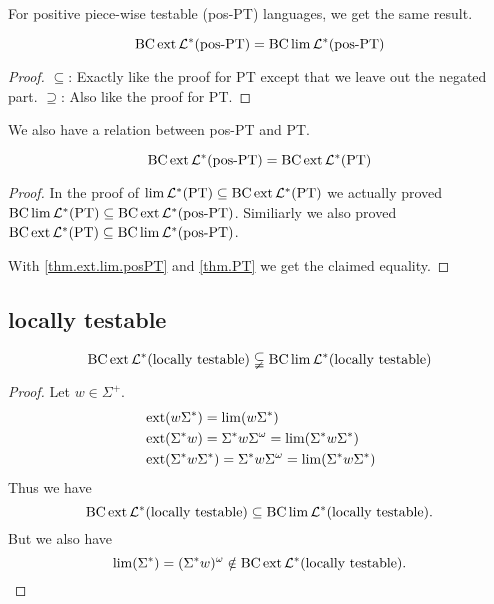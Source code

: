 \label{lang:posPT}
For positive piece-wise testable (pos-PT) languages, we get the same result.

\label{thm.ext.lim.posPT}
\begin{thm}
\[ \operatorname{BC} \operatorname{ext} \mathcal{L}^* (\textup{\textrm{pos-PT}}) = \operatorname{BC} \lim \mathcal{L}^* (\textup{\textrm{pos-PT}}) \]
\end{thm}

\begin{proof}
$\subseteq$: Exactly like the proof for PT except that we leave out the negated part.
$\supseteq$: Also like the proof for PT.
\end{proof}

We also have a relation between pos-PT and PT.

\begin{thm}
\[ \operatorname{BC} \operatorname{ext} \mathcal{L}^*(\textup{\textrm{pos-PT}}) = \operatorname{BC} \operatorname{ext} \mathcal{L}^* (\textup{\textrm{PT}}) \]

\begin{proof}
In the proof of $\lim \mathcal{L}^*(\textup{\textrm{PT}}) \subseteq \operatorname{BC} \operatorname{ext} \mathcal{L}^* (\textup{\textrm{PT}})$ we actually proved $\operatorname{BC} \lim \mathcal{L}^*(\textup{\textrm{PT}}) \subseteq \operatorname{BC} \operatorname{ext} \mathcal{L}^* (\textup{\textrm{pos-PT}})$. Similiarly we also proved $\operatorname{BC} \operatorname{ext} \mathcal{L}^* (\textup{\textrm{PT}}) \subseteq \operatorname{BC} \lim \mathcal{L}^* (\textup{\textrm{pos-PT}})$.

With \ref{thm.ext.lim.posPT} and \ref{thm.PT} we get the claimed equality.
\end{proof}
\end{thm}


\subsection{locally testable}
\label{lang:LT}

\begin{thm}
\[ \operatorname{BC} \operatorname{ext} \mathcal{L}^* (\textup{\textrm{locally testable}}) \subsetneqq \operatorname{BC} \lim \mathcal{L}^*(\textup{\textrm{locally testable}})  \]
\end{thm}

\begin{proof}
Let $w \in \Sigma^+$.
\begin{align*}
& \operatorname{ext} (w \Sigma^*) = \lim(w \Sigma^*) \\
& \operatorname{ext}( \Sigma^* w) = \Sigma^* w \Sigma^\omega = \lim( \Sigma^* w \Sigma^* ) \\
& \operatorname{ext}( \Sigma^* w \Sigma^*) = \Sigma^* w \Sigma^\omega = \lim( \Sigma^* w \Sigma^* )
\end{align*}
Thus we have
\[ \operatorname{BC} \operatorname{ext} \mathcal{L}^* (\textup{\textrm{locally testable}}) \subseteq \operatorname{BC} \lim \mathcal{L}^*(\textup{\textrm{locally testable}}) . \]
But we also have
\[ \lim(\Sigma^*) = (\Sigma^* w)^\omega \notin \operatorname{BC} \operatorname{ext} \mathcal{L}^* (\textup{\textrm{locally testable}}) . \]
\end{proof}

